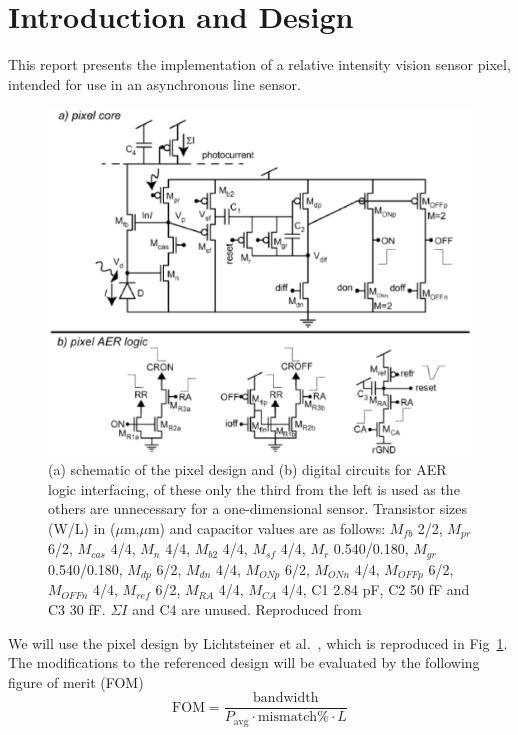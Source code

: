 \section{Introduction and Design}
This report presents the implementation of a relative intensity vision sensor pixel, intended for use in 
an asynchronous line sensor. 
\begin{figure}
    \center
    \includegraphics[trim={4.5cm 0 4.5cm 0},clip,width=\textwidth]{pixel-design.eps}
    \caption{(a) schematic of the pixel design and (b) digital circuits for AER logic interfacing, of these only the 
    third from the left is used as the others are unnecessary for a one-dimensional sensor. Transistor sizes (W/L) in
    (\(\mu\)m,\(\mu\)m) and capacitor values are as follows: \(M_{fb}\) 2/2, \(M_{pr}\) 6/2, \(M_{cas}\) 4/4, \(M_n\) 4/4,
    \(M_{b2}\) 4/4, \(M_{sf}\) 4/4, \(M_r\) 0.540/0.180, \(M_{gr}\) 0.540/0.180, \(M_{dp}\) 6/2, \(M_{dn}\) 4/4,
    \(M_{ONp}\) 6/2, \(M_{ONn}\) 4/4, \(M_{OFFp}\) 6/2, \(M_{OFFn}\) 4/4, \(M_{ref}\) 6/2, \(M_{RA}\) 4/4, \(M_{CA}\) 4/4,
    C1 2.84 pF, C2 50 fF and C3 30 fF. \(\Sigma I\) and C4 are unused. Reproduced from~\cite{Lichtsteiner2008}}
    \label{fig:pixel-design}
\end{figure}
We will use the pixel design by Lichtsteiner et al.~\cite{Lichtsteiner2008}, which is reproduced in Fig~\ref{fig:pixel-design}.
The modifications to the referenced design will be evaluated by the following figure of merit (FOM)
\begin{equation}
    \text{FOM} = \frac{\text{bandwidth}}{P_{\text{avg}}\cdot \text{mismatch\%}\cdot L}
    \label{eq:FOM}
\end{equation}
